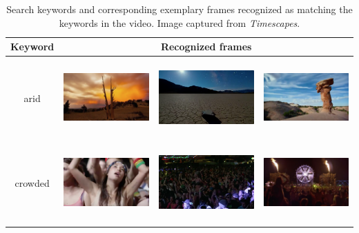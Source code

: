 \documentclass{article}
\begin{document}
\begin{table}[t]
	\label{tab:result}
    \centering
    \caption{Search keywords and corresponding exemplary frames recognized as matching the keywords in the video. Image captured from \textit{Timescapes}. }
    \begin{tabular}{c c c c}
    	\toprule
    	Keyword & & Recognized frames & \\
    	\midrule
    	arid
    		& \includegraphics[width=4cm,height=3cm]{image/arid-1.png}
    		& \includegraphics[width=4cm,height=3cm]{image/arid-2.png}
    		& \includegraphics[width=4cm,height=3cm]{image/arid-3.png}
    		\\
    	\midrule
    	crowded
    		& \includegraphics[width=4cm,height=3cm]{image/crowded-1.png}
    		& \includegraphics[width=4cm,height=3cm]{image/crowded-2.png}
    		& \includegraphics[width=4cm,height=3cm]{image/crowded-3.png}

\end{tabular}
\end{table}
\end{document}

